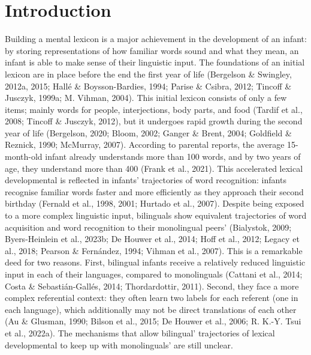 \documentclass[
  12pt,
  b5paperpaper,
  twoside]{scrreprt}
\begin{document}
\hypertarget{introduction-2}{%
\section{Introduction}\label{introduction-2}}

Building a mental lexicon is a major achievement in the development of
an infant: by storing representations of how familiar words sound and
what they mean, an infant is able to make sense of their linguistic
input. The foundations of an initial lexicon are in place before the end
the first year of life (Bergelson \& Swingley, 2012a, 2015; Hallé \&
Boysson-Bardies, 1994; Parise \& Csibra, 2012; Tincoff \& Jusczyk,
1999a; M. Vihman, 2004). This initial lexicon consists of only a few
items; mainly words for people, interjections, body parts, and food
(Tardif et al., 2008; Tincoff \& Jusczyk, 2012), but it undergoes rapid
growth during the second year of life (Bergelson, 2020; Bloom, 2002;
Ganger \& Brent, 2004; Goldfield \& Reznick, 1990; McMurray, 2007).
According to parental reports, the average 15-month-old infant already
understands more than 100 words, and by two years of age, they
understand more than 400 (Frank et al., 2021). This accelerated lexical
developmental is reflected in infants' trajectories of word recognition:
infants recognise familiar words faster and more efficiently as they
approach their second birthday (Fernald et al., 1998, 2001; Hurtado et
al., 2007). Despite being exposed to a more complex linguistic input,
bilinguals show equivalent trajectories of word acquisition and word
recognition to their monolingual peers' (Bialystok, 2009; Byers-Heinlein
et al., 2023b; De Houwer et al., 2014; Hoff et al., 2012; Legacy et al.,
2018; Pearson \& Fernández, 1994; Vihman et al., 2007). This is a
remarkable deed for two reasons. First, bilingual infants receive a
relatively reduced linguistic input in each of their languages, compared
to monolinguals (Cattani et al., 2014; Costa \& Sebastián-Gallés, 2014;
Thordardottir, 2011). Second, they face a more complex referential
context: they often learn two labels for each referent (one in each
language), which additionally may not be direct translations of each
other (Au \& Glusman, 1990; Bilson et al., 2015; De Houwer et al., 2006;
R. K.-Y. Tsui et al., 2022a). The mechanisms that allow bilingual'
trajectories of lexical developmental to keep up with monolinguals' are
still unclear.
\end{document}
